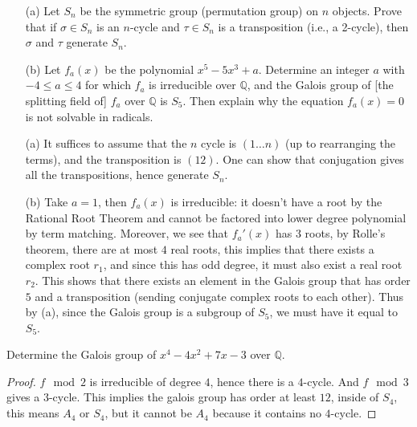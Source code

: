 \begin{prob}[F2014-Q1]
    \phantom{text}
    \begin{itemize}
        \item[(a)] Let \(S_n\) be the symmetric group (permutation group) on \(n\) objects. Prove that if \(\sigma \in S_n\) is an \(n\)-cycle and \(\tau \in S_n\) is a transposition (i.e., a 2-cycle), then \(\sigma\) and \(\tau\) generate \(S_n\).
        \item[(b)] Let \(f_a(x)\) be the polynomial \(x^5 - 5x^3 + a\). Determine an integer \(a\) with \(-4 \leq a \leq 4\) for which \(f_a\) is irreducible over \(\mathbb{Q}\), and the Galois group of [the splitting field of] \(f_a\) over \(\mathbb{Q}\) is \(S_5\). Then explain why the equation \(f_a(x) = 0\) is not solvable in radicals.
    \end{itemize}
\end{prob}
\begin{itemize}
    \item[(a)] It suffices to assume that the $n$ cycle is $(1\dots n)$ (up to rearranging the terms), and the transposition is $(12)$. One can show that conjugation gives all the transpositions, hence generate $S_n$.
    \item[(b)] Take $a=1$, then $f_a(x)$ is irreducible: it doesn't have a root by the Rational Root Theorem and cannot be factored into lower degree polynomial by term matching. Moreover, we see that $f_a'(x)$ has $3$ roots, by Rolle's theorem, there are at most $4$ real roots, this implies that there exists a complex root $r_1$, and since this has odd degree, it must also exist a real root $r_2$. This shows that there exists an element in the Galois group that has order $5$ and a transposition (sending conjugate complex roots to each other). Thus by (a), since the Galois group is a subgroup of $S_5$, we must have it equal to $S_5$. 
\end{itemize}


\begin{prob}[F2009-Q3]
    Determine the Galois group of \(x^4 - 4x^2 + 7x - 3\) over \(\mathbb{Q}\).
\end{prob}
\begin{proof}
    $f\mod 2$ is irreducible of degree $4$, hence there is a $4$-cycle. And $f\mod 3$ gives a $3$-cycle. This implies the galois group has order at least $12$, inside of $S_4$, this means $A_4$ or $S_4$, but it cannot be $A_4$ because it contains no $4$-cycle.
\end{proof}

